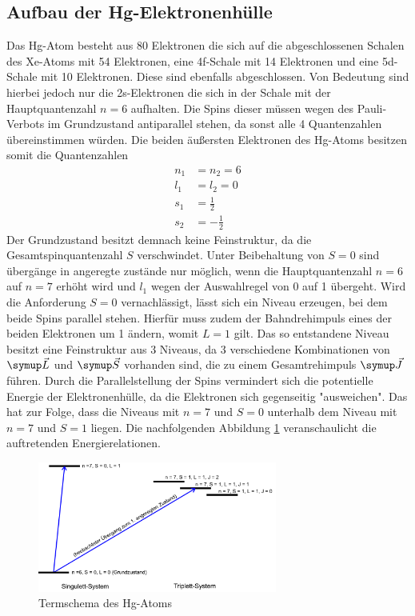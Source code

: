 \subsection{Aufbau der Hg-Elektronenhülle}
Das Hg-Atom besteht aus 80 Elektronen die sich auf die abgeschlossenen Schalen
des Xe-Atoms mit 54 Elektronen, eine 4f-Schale mit 14 Elektronen und eine
5d-Schale mit 10 Elektronen. Diese sind ebenfalls abgeschlossen. Von Bedeutung
sind hierbei jedoch nur die 2s-Elektronen die sich in der Schale mit der
Hauptquantenzahl $n=6$ aufhalten. Die Spins dieser müssen wegen des
Pauli-Verbots im Grundzustand antiparallel stehen, da sonst alle 4
Quantenzahlen übereinstimmen würden.
Die beiden äußersten Elektronen des Hg-Atoms besitzen somit die
Quantenzahlen
\begin{align*}
  n_1 &= n_2 = 6 \\
  l_1 &= l_2 = 0 \\
  s_1 &= \frac{1}{2} \\
  s_2 &= - \frac{1}{2}
\end{align*}
Der Grundzustand besitzt demnach keine Feinstruktur, da die Gesamtspinquantenzahl
$S$ verschwindet. Unter Beibehaltung von $S=0$ sind übergänge in angeregte
zustände nur möglich, wenn die Hauptquantenzahl $n=6$ auf $n=7$ erhöht wird
und $l_1$ wegen der Auswahlregel von 0 auf 1 übergeht. Wird die Anforderung
$S=0$ vernachlässigt, lässt sich ein Niveau erzeugen, bei dem beide Spins
parallel stehen. Hierfür muss zudem der Bahndrehimpuls eines der beiden
Elektronen um 1 ändern, womit $L=1$ gilt. Das so entstandene Niveau besitzt
eine Feinstruktur aus 3 Niveaus, da 3 verschiedene Kombinationen von
$\su{\vec{L}}$ und $\su{\vec{S}}$ vorhanden sind, die zu einem Gesamtrehimpuls
$\su{\vec{J}}$ führen. Durch die Parallelstellung der Spins vermindert sich
die potentielle Energie der Elektronenhülle, da die Elektronen sich gegenseitig
"ausweichen". Das hat zur Folge, dass die Niveaus mit $n=7$ und $S=0$ unterhalb
dem Niveau mit $n=7$ und $S=1$ liegen. Die nachfolgenden Abbildung \ref{fig:termschema}
veranschaulicht die auftretenden Energierelationen.
\begin{figure}
  \centering
  \includegraphics[width=0.7\textwidth]{bilder/term.jpg}
  \caption{Termschema des Hg-Atoms\cite{601}}
  \label{fig:termschema}
\end{figure}
